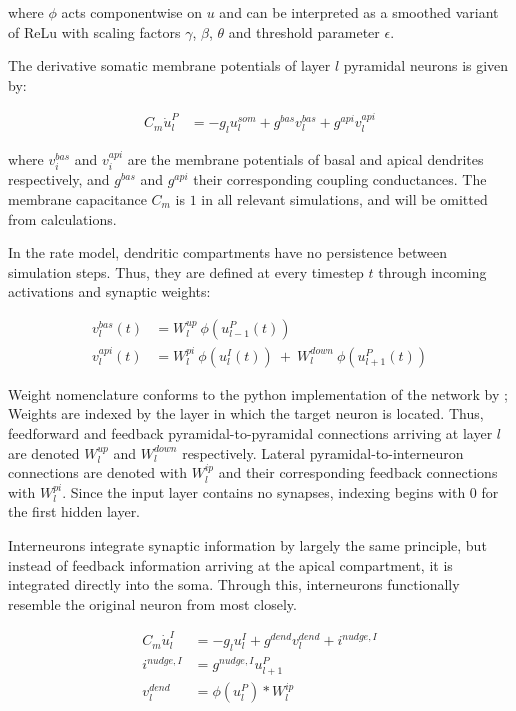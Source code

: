 where $\phi$ acts componentwise on $u$ and can be interpreted as a smoothed variant of ReLu  with scaling factors $\gamma$, $\beta$,
$\theta$ and threshold parameter $\epsilon$.


The derivative somatic membrane potentials of layer $l$ pyramidal neurons is given by:

\begin{align}
  C_m \dot{u}_l^P & = - g_l u_l^{som} + g^{bas} v_l^{bas} + g^{api} v_l^{api}
\end{align}

where $v_i^{bas}$ and $v_i^{api}$ are the membrane potentials of basal and apical dendrites respectively, and $g^{bas}$
and $g^{api}$ their corresponding coupling conductances. The membrane capacitance $C_m$ is $1$ in all relevant simulations,
and will be omitted from calculations.


In the rate model, dendritic compartments have no persistence
between simulation steps. Thus, they are defined at every timestep $t$ through incoming activations and synaptic weights:

\begin{align}
  v_l^{bas}(t) & = W_l^{up} \ \phi(u_{l-1}^P(t))                                     \\
  v_l^{api}(t) & =  W_l^{pi} \ \phi(u_l^I(t)) \ + \  W_l^{down} \ \phi(u_{l+1}^P(t))
\end{align}

Weight nomenclature conforms to the python implementation of the network by \cite{Haider2021}; Weights are indexed by
 the layer in which
the target neuron is located. Thus, feedforward and feedback pyramidal-to-pyramidal connections arriving at layer $l$
are denoted $W_l^{up}$ and $W_l^{down}$ respectively. Lateral pyramidal-to-interneuron connections are denoted with $W_l^{ip}$
and their corresponding feedback connections with $W_l^{pi}$. Since the input layer contains no synapses, indexing begins
with $0$ for the first hidden layer. \newline

Interneurons integrate synaptic information by largely the same principle, but
instead of feedback information arriving at the apical compartment, it is integrated directly into the soma. Through
this, interneurons functionally resemble the original neuron from \cite{urbanczik2014learning} most closely.

\begin{align}
  C_m \dot{u}_l^I & = - g_l u_l^{I} + g^{dend} v_l^{dend} + i^{nudge, I} \\
  i^{nudge, I}    & = g^{nudge, I} u_{l+1}^P                             \\
  v_l^{dend}      & = \phi(u_{l}^P) * W_l^{ip}
\end{align}

